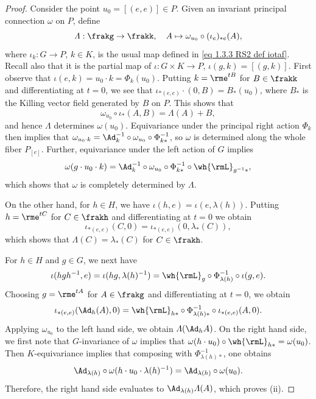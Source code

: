 \begin{proof}
    Consider the point $u_0=[(e,e)]\in P$. Given an invariant principal connection $\omega$ on $P$, define 
    \[\varLambda:\frakg\to \frakk,\quad A\mapsto \omega_{u_0}\circ (\iota_e)_{\ast e}(A),\]
    where $\iota_k:G\to P$, $k\in K$, is the usual map defined in \eqref{eq 1.3.3 RS2 def iotaf}. Recall also that it is the partial map of $\iota:G\times K\to P$, $\iota(g,k)=[(g,k)]$. First observe that $\iota(e,k)=u_0\cdot k=\Phi_k(u_0)$. Putting $k=\rme^{tB}$ for $B\in\frakk$ and differentiating at $t=0$, we see that $\iota_{\ast(e,e)}\cdot (0,B)=B_{\ast}(u_0)$, where $B_\ast$ is the Killing vector field generated by $B$ on $P$.  This shows that 
    \[\omega_{u_0}\circ \iota_\ast(A,B)=\varLambda(A)+B,\label{4797}\] 
    and hence $\varLambda$ determines $\omega(u_0)$. Equivariance under the principal right action $\Phi_k$ then implies that $\omega_{u_0\cdot k}=\Ad_k^{-1}\circ \omega_{u_0}\circ \Phi_{k\ast}^{-1}$, so $\omega$ is determined along the whole fiber $P_{[e]}$. Further, equivariance under the left action of $G$ implies 
    \[\omega(g\cdot u_0\cdot k)=\Ad_k^{-1}\circ \omega_{u_0}\circ \Phi_{k\ast}^{-1}\circ \wh{\rmL}_{g^{-1}\ast},\label{eq 1.10 Cap}\]
    which shows that $\omega$ is completely determined by $\varLambda$.

    On the other hand, for $h\in H$, we have $\iota(h,e)=\iota(e,\lambda(h))$. Putting $h=\rme^{tC}$ for $C\in\frakh$ and differentiating at $t=0$ we obtain 
    \[\iota_{\ast(e,e)}(C,0)=\iota_{\ast(e,e)}(0,\lambda_\ast(C)),\]
    which shows that $\varLambda(C)=\lambda_\ast(C)$ for $C\in\frakh$.

    For $h\in H$ and $g\in G$, we next have 
    \[\iota(hgh^{-1},e)=\iota(hg,\lambda(h)^{-1})=\wh{\rmL}_g\circ \Phi_{\lambda(h)}^{-1}\circ \iota(g,e).\]
    Choosing $g=\rme^{tA}$ for $A\in\frakg$ and differentiating at $t=0$, we obtain 
    \[\iota_{\ast(e,e)}(\Ad_h(A),0)=\wh{\rmL}_{h\ast}\circ \Phi_{\lambda(h)\ast}^{-1}\circ \iota_{\ast(e,e)}(A,0).\]
    Applying $\omega_{u_0}$ to the left hand side, we obtain $\varLambda(\Ad_h A)$. On the right hand side, we first note that $G$-invariance of $\omega$ implies that $\omega(h\cdot u_0)\circ \wh{\rmL}_{h\ast}=\omega(u_0)$. Then $K$-equivariance implies that composing with $\Phi_{\lambda(h)\ast}^{-1}$, one obtains 
    \[\Ad_{\lambda(h)}\circ \omega(h\cdot u_0\cdot \lambda(h)^{-1})=\Ad_{\lambda(h)}\circ \omega(u_0).\]
    Therefore, the right hand side evaluates to $\Ad_{\lambda(h)}\varLambda(A)$, which proves (ii).


\end{proof}
